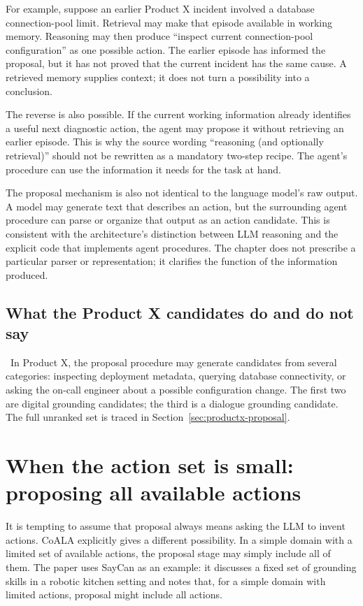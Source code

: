 For example, suppose an earlier Product X incident involved a database connection-pool limit. Retrieval may make that episode available in working memory. Reasoning may then produce ``inspect current connection-pool configuration'' as one possible action. The earlier episode has informed the proposal, but it has not proved that the current incident has the same cause. A retrieved memory supplies context; it does not turn a possibility into a conclusion.

The reverse is also possible. If the current working information already identifies a useful next diagnostic action, the agent may propose it without retrieving an earlier episode. This is why the source wording ``reasoning (and optionally retrieval)'' should not be rewritten as a mandatory two-step recipe. The agent's procedure can use the information it needs for the task at hand.

The proposal mechanism is also not identical to the language model's raw output. A model may generate text that describes an action, but the surrounding agent procedure can parse or organize that output as an action candidate. This is consistent with the architecture's distinction between LLM reasoning and the explicit code that implements agent procedures. The chapter does not prescribe a particular parser or representation; it clarifies the function of the information produced.

\subsection{What the Product X candidates do and do not say}

\BookExampleLabel\ In Product X, the proposal procedure may generate candidates from several categories: inspecting deployment metadata, querying database connectivity, or asking the on-call engineer about a possible configuration change. The first two are digital grounding candidates; the third is a dialogue grounding candidate. The full unranked set is traced in Section~\ref{sec:productx-proposal}.

\section{When the action set is small: proposing all available actions}
\label{sec:enumerating-action-set}

It is tempting to assume that proposal always means asking the LLM to invent actions. CoALA explicitly gives a different possibility. In a simple domain with a limited set of available actions, the proposal stage may simply include all of them. The paper uses SayCan as an example: it discusses a fixed set of grounding skills in a robotic kitchen setting and notes that, for a simple domain with limited actions, proposal might include all actions.

